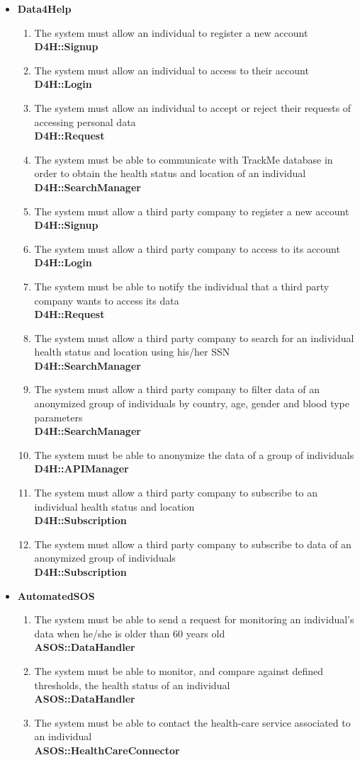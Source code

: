 \documentclass[a4paper, hidelinks, 12pt]{report}
\newcommand\requirement[1]{\item[{[R#1]}] }
\begin{document}
\begin{itemize}
	\item{\textbf{Data4Help}}
	\begin{enumerate}
		\requirement{1} The system must allow an individual to register a new account \\
		\textbf{D4H::Signup}
		\requirement{2} The system must allow an individual to access to their account \\
		\textbf{D4H::Login}
		\requirement{3} The system must allow an individual to accept or reject their requests of accessing personal data \\
		\textbf{D4H::Request}
		\requirement{4} The system must be able to communicate with TrackMe database in order to obtain the health status and location of an individual \\
		\textbf{D4H::SearchManager}
		\requirement{5} The system must allow a third party company to register a new account \\								\textbf{D4H::Signup}
		\requirement{6} The system must allow a third party company to access to its account 	\\								\textbf{D4H::Login}
		\requirement{7} The system must be able to notify the individual that a third party company wants to access its data \\
		\textbf{D4H::Request}
		\requirement{8} The system must allow a third party company to search for an individual health status and location using his/her SSN \\
		 \textbf{D4H::SearchManager}
		 \requirement{9} The system must allow a third party company to filter data of an anonymized group of individuals by country, age, gender and blood type parameters \\ 
		 \textbf{D4H::SearchManager}
		 \requirement{10} The system must be able to anonymize the data of a group of individuals \\
		 \textbf{D4H::APIManager}
		 \requirement{11} The system must allow a third party company to subscribe to an individual health status and location \\ 
		\textbf{D4H::Subscription}
		\requirement{12} The system must allow a third party company to subscribe to data of an anonymized group of individuals \\
		\textbf{D4H::Subscription}
	\end{enumerate}	
		
	\item{\textbf{AutomatedSOS}}
	\begin{enumerate}
		\requirement{13} The system must be able to send a request for monitoring an individual's data when he/she is older than 60 years old \\
		\textbf{ASOS::DataHandler}
		\requirement{14} The system must be able to monitor, and compare against defined thresholds, the health status of an individual \\
		\textbf{ASOS::DataHandler}
		\requirement{15} The system must be able to contact the health-care service associated to an individual \\
		\textbf{ASOS::HealthCareConnector}
	\end{enumerate}
	

\end{itemize}
\end{document}
